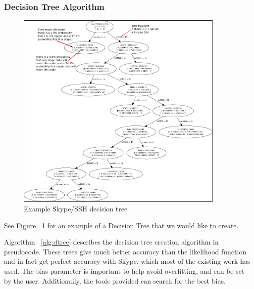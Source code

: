 \subsubsection{Decision Tree Algorithm}
\label{dtree}

\begin{figure}
  \centering
  \includegraphics[width=0.9\textwidth]{sshdtree.pdf}
  \caption{Example Skype/SSH decision tree}
  \label{fig:dtree}
\end{figure}

See Figure ~\ref{fig:dtree} for an example of a Decision Tree that we would like to create.

Algorithm ~\ref{alg:dtree} describes the decision tree creation algorithm in pseudocode.  These trees give much better accuracy than the likelihood function and in fact get perfect accuracy with Skype, which most of the existing work has used.  The bias parameter is important to help avoid overfitting, and can be set by the user.  Additionally, the tools provided can search for the best bias.

